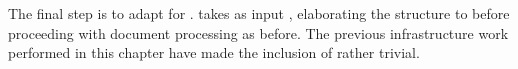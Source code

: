 The final step is to adapt  for .  takes as input , elaborating the structure to  before proceeding with document processing as before. The previous infrastructure work performed in this chapter have made the inclusion of  rather trivial.


%

